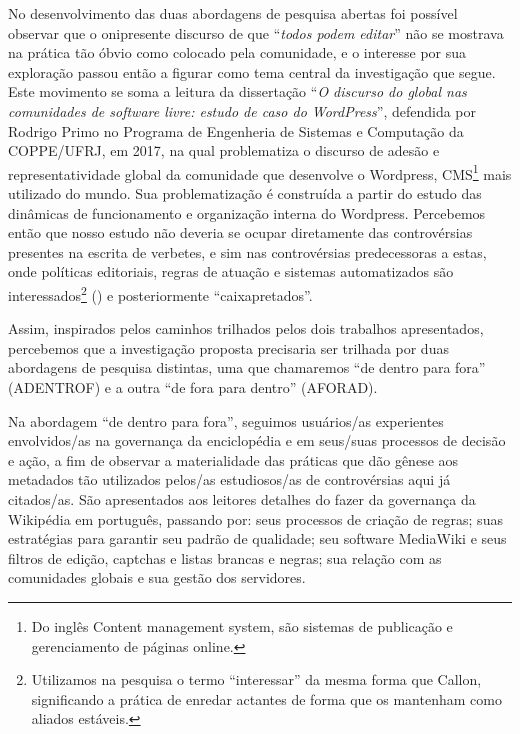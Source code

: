 No desenvolvimento das duas abordagens de pesquisa abertas foi possível observar que o onipresente discurso de que “\textit{todos podem editar}” não se mostrava na prática tão óbvio como colocado pela comunidade, e o interesse por sua exploração passou então a figurar como tema central da investigação que segue. Este movimento se soma a leitura da dissertação “\textit{O discurso do global nas comunidades de software livre: estudo de caso do WordPress}”, defendida por Rodrigo Primo no Programa de Engenheria de Sistemas e Computação da COPPE/UFRJ, em 2017, na qual problematiza o discurso de adesão e representatividade global da comunidade que desenvolve o Wordpress, CMS\footnote{Do inglês Content management system, são sistemas de publicação e gerenciamento de páginas online.} mais utilizado do mundo. Sua problematização é construída a partir do estudo das dinâmicas de funcionamento e organização interna do Wordpress. Percebemos então que nosso estudo não deveria se ocupar diretamente das controvérsias presentes na escrita de verbetes, e sim nas controvérsias predecessoras a estas, onde políticas editoriais, regras de atuação e sistemas automatizados são interessados\footnote{Utilizamos na pesquisa o termo ``interessar'' da mesma forma que Callon, significando a prática de enredar actantes de forma que os mantenham como aliados estáveis.} (\cite{callon_scallops_1986}) e posteriormente ``caixapretados''.

Assim, inspirados pelos caminhos trilhados pelos dois trabalhos apresentados, percebemos que a investigação proposta precisaria ser trilhada por duas abordagens de pesquisa distintas, uma que chamaremos ``de dentro para fora'' (ADENTROF) e a outra ``de fora para dentro'' (AFORAD).

Na abordagem ``de dentro para fora'', seguimos usuários/as experientes envolvidos/as na governança da enciclopédia e em seus/suas processos de decisão e ação, a fim de observar a materialidade das práticas que dão gênese aos metadados tão utilizados pelos/as estudiosos/as de controvérsias aqui já citados/as. São apresentados aos leitores detalhes do fazer da governança da Wikipédia em português, passando por: seus processos de criação de regras; suas estratégias para garantir seu padrão de qualidade; seu software MediaWiki e seus filtros de edição, captchas e listas brancas e negras; sua relação com as comunidades globais e sua gestão dos servidores.

